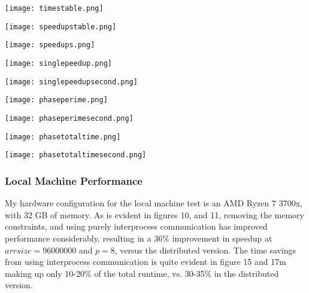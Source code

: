 \documentclass[11pt]{report}
\newcommand{\SCALE}{0.5}
\begin{document}
\begin{minipage}{\SCALE\linewidth}
\texttt{[image: timestable.png]}
\end{minipage}
\hfill
\begin{minipage}{\SCALE\linewidth}
\texttt{[image: speedupstable.png]}
\end{minipage}

\begin{minipage}{\SCALE\linewidth}
\texttt{[image: speedups.png]}
\end{minipage}
\hfill
\begin{minipage}{\SCALE\linewidth}
\texttt{[image: singlepeedup.png]}
\end{minipage}

\begin{minipage}{\SCALE\linewidth}
\texttt{[image: singlepeedupsecond.png]}
\end{minipage}

\begin{minipage}{\SCALE\linewidth}
\texttt{[image: phaseperime.png]}
\end{minipage}
\hfill
\begin{minipage}{\SCALE\linewidth}
\texttt{[image: phaseperimesecond.png]}
\end{minipage}

\begin{minipage}{\SCALE\linewidth}
\texttt{[image: phasetotaltime.png]}
\end{minipage}
\hfill
\begin{minipage}{\SCALE\linewidth}
\texttt{[image: phasetotaltimesecond.png]}
\end{minipage}


\subsubsection*{Local Machine Performance}
My hardware configuration for the local machine test is an AMD Ryzen 7 3700x, with 32 GB of memory. As is evident in figures 10, and 11, removing the memory constraints, and 
using purely interprocess communication has improved performance considerably, resulting in a
36\% improvement in speedup at $arrsize=96000000$ and $p=8$, versus the distributed version. The time savings from using interprocess communication is quite evident in figure 15 and 17m making up only 10-20\% of the total runtime, vs. 30-35\% in the distributed version.
\end{document}
